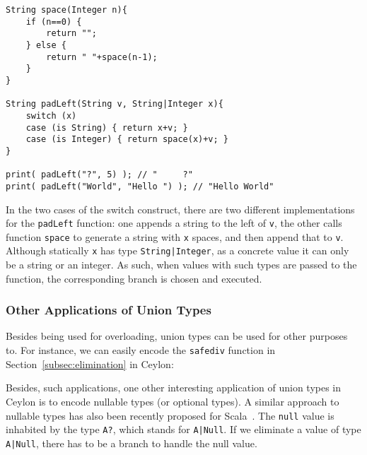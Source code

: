 \begin{lstlisting}
String space(Integer n){
	if (n==0) {
		return "";
	} else {
		return " "+space(n-1);
	}
}

String padLeft(String v, String|Integer x){
	switch (x)
	case (is String) { return x+v; }
	case (is Integer) { return space(x)+v; }
}

print( padLeft("?", 5) ); // "     ?"
print( padLeft("World", "Hello ") ); // "Hello World"
\end{lstlisting}
%

In the two cases of the switch construct, there are two different implementations
for the \lstinline{padLeft} function: one appends a string to the left of \lstinline{v},
the other calls function \lstinline{space} to generate a string with \lstinline{x} spaces,
and then append that to \lstinline{v}.
Although statically \lstinline{x} has type \lstinline{String|Integer}, as a concrete value 
it can only be a string or an integer.
As such, when values with such types are passed to the function,
the corresponding branch is chosen and executed.

\subsubsection*{Other Applications of Union Types}
Besides being used for overloading, union types can be used for other purposes to.
For instance, we can easily encode the \lstinline{safediv} function in Section~\ref{subsec:elimination}
in Ceylon:

Besides, such applications, one other interesting application
of union types in Ceylon is to encode nullable types (or optional types).
A similar approach to nullable types has also been recently proposed for Scala~\citep{nieto20nulls}.
The \lstinline{null} value is inhabited by the type \lstinline{A?},
which stands for \lstinline{A|Null}.
If we eliminate a value of type \lstinline{A|Null}, there has to be a branch to handle
the null value. 

